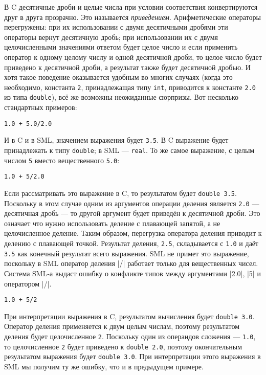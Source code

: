 В C десятичные дроби и целые числа при условии соответствия конвертируются друг в друга прозрачно. Это называется \emph{приведением}. Арифметические операторы перегружены: при их использовании с двумя десятичными дробями эти операторы вернут десятичную дробь; при использовании их с двумя целочисленными значениями ответом будет целое число и если применить оператор к одному целому числу и одной десятичной дроби, то целое число будет приведено к десятичной дроби, а результат также будет десятичной дробью. И хотя такое поведение оказывается удобным во многих случаях (когда это необходимо, константа \lstinline|2|, принадлежащая типу \lstinline|int|, приводится к константе \lstinline|2.0| из типа \lstinline|double|), всё же возможны неожиданные сюрпризы. Вот несколько стандартных примеров:

\begin{lstlisting}
1.0 + 5.0/2.0
\end{lstlisting}

И в C и в SML, значением выражения будет \lstinline|3.5|. В C выражение будет принадлежать к типу \lstinline|double|; в SML --- \lstinline|real|. То же самое выражение, с целым числом \lstinline|5| вместо вещественного \lstinline|5.0|:

\begin{lstlisting}
1.0 + 5/2.0
\end{lstlisting}

Если рассматривать это выражение в C, то результатом будет \lstinline|double 3.5|. Поскольку в этом случае одним из аргументов операции деления является \lstinline|2.0| --- десятичная дробь --- то другой аргумент будет приведён к десятичной дроби. Это означает что нужно использовать деление с плавающей запятой, а не целочисленное деление. Таким образом, перегрузка оператора деления приводит к делению с плавающей точкой. Результат деления, \lstinline|2.5|, складывается с \lstinline|1.0| и даёт \lstinline|3.5| как конечный результат всего выражения. SML не примет это выражение, поскольку в SML оператор деления \inline|/| работает только для вещественных чисел. Система SML-а выдаст ошибку о конфликте типов между аргументами \inline|2.0|, \inline|5| и оператором \inline|/|.

\begin{lstlisting}
1.0 + 5/2
\end{lstlisting}

При интерпретации выражения в C, результатом вычисления будет \lstinline|double 3.0|. Оператор деления применяется к двум целым числам, поэтому результатом деления будет целочисленное \lstinline|2|. Поскольку один из операндов сложения --- \lstinline|1.0|, то целочисленное \lstinline|2| будет приведено к \lstinline|double 2.0|, поэтому окончательным результатом выражения будет \lstinline|double 3.0|. При интерпретации этого выражения в SML мы получим ту же ошибку, что и в предыдущем  примере.

